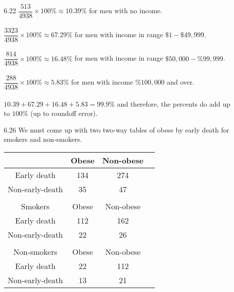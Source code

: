 \documentclass[11pt, a4paper]{article}
\begin{document}
\begin{itemize}
\item[]
\item[]

\item[6.22]
$\dfrac{513}{4938} \times 100\% \approx 10.39\%$ for men with no income.\\\\
$\dfrac{3323}{4938} \times 100\% \approx 67.29\%$ for men with income in range $\$1 - \$49, 999$.\\\\
$\dfrac{814}{4938} \times 100\% \approx 16.48\%$ for men with income in range $\$50, 000 - \%99, 999$.\\\\
$\dfrac{288}{4938} \times 100\% \approx 5.83\%$ for men with income $\%100, 000$ and over.\\\\
$10.39 + 67.29 + 16.48 + 5.83 = 99.9\%$ and therefore, the percents do
add up to $100\%$ (up to roundoff error).

\item[]
\item[]

\item[6.26]
We must come up with two two-way tables of obese by early death
for smokers and non-smokers.
\begin{center}
        \begin{tabular}{ |c|c|c|c| }
        \hline
         & Obese & Non-obese\\
        \hline
        Early death & 134 & 274\\
        Non-early-death & 35 & 47\\
        & & \\
        \hline
        Smokers & Obese & Non-obese\\
        \hline
        Early death & 112 & 162\\
        Non-early-death & 22 & 26\\
        & & \\
        \hline
        Non-smokers & Obese & Non-obese\\
        \hline
        Early death & 22 & 112\\
        Non-early-death & 13 & 21\\
        \hline
    \end{tabular}
\end{center}

\newpage


\end{itemize}
\end{document}
